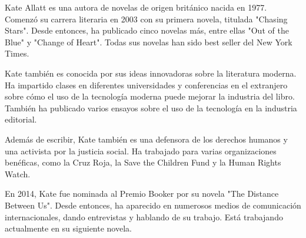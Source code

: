 
Kate Allatt es una autora de novelas de origen británico nacida en 1977. Comenzó su carrera literaria en 2003 con su primera novela, titulada "Chasing Stars". Desde entonces, ha publicado cinco novelas más, entre ellas "Out of the Blue" y "Change of Heart". Todas sus novelas han sido best seller del New York Times. 

Kate también es conocida por sus ideas innovadoras sobre la literatura moderna. Ha impartido clases en diferentes universidades y conferencias en el extranjero sobre cómo el uso de la tecnología moderna puede mejorar la industria del libro. También ha publicado varios ensayos sobre el uso de la tecnología en la industria editorial. 

Además de escribir, Kate también es una defensora de los derechos humanos y una activista por la justicia social. Ha trabajado para varias organizaciones benéficas, como la Cruz Roja, la Save the Children Fund y la Human Rights Watch. 

En 2014, Kate fue nominada al Premio Booker por su novela "The Distance Between Us". Desde entonces, ha aparecido en numerosos medios de comunicación internacionales, dando entrevistas y hablando de su trabajo. Está trabajando actualmente en su siguiente novela.